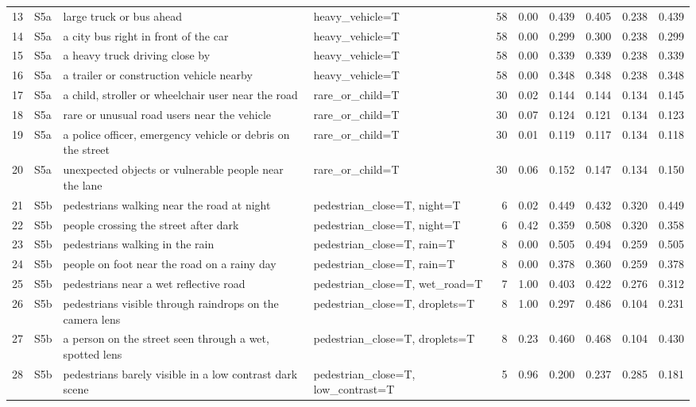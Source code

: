 \begin{longtable}{r l p{4.0cm} p{3.0cm} r r r r r r}
13 & S5a & large truck or bus ahead & heavy\_vehicle=T & 58 & 0.00 & 0.439 & 0.405 & 0.238 & 0.439\\
14 & S5a & a city bus right in front of the car & heavy\_vehicle=T & 58 & 0.00 & 0.299 & 0.300 & 0.238 & 0.299\\
15 & S5a & a heavy truck driving close by & heavy\_vehicle=T & 58 & 0.00 & 0.339 & 0.339 & 0.238 & 0.339\\
16 & S5a & a trailer or construction vehicle nearby & heavy\_vehicle=T & 58 & 0.00 & 0.348 & 0.348 & 0.238 & 0.348\\
17 & S5a & a child, stroller or wheelchair user near the road & rare\_or\_child=T & 30 & 0.02 & 0.144 & 0.144 & 0.134 & 0.145\\
18 & S5a & rare or unusual road users near the vehicle & rare\_or\_child=T & 30 & 0.07 & 0.124 & 0.121 & 0.134 & 0.123\\
19 & S5a & a police officer, emergency vehicle or debris on the street & rare\_or\_child=T & 30 & 0.01 & 0.119 & 0.117 & 0.134 & 0.118\\
20 & S5a & unexpected objects or vulnerable people near the lane & rare\_or\_child=T & 30 & 0.06 & 0.152 & 0.147 & 0.134 & 0.150\\
21 & S5b & pedestrians walking near the road at night & pedestrian\_close=T, night=T & 6 & 0.02 & 0.449 & 0.432 & 0.320 & 0.449\\
22 & S5b & people crossing the street after dark & pedestrian\_close=T, night=T & 6 & 0.42 & 0.359 & 0.508 & 0.320 & 0.358\\
23 & S5b & pedestrians walking in the rain & pedestrian\_close=T, rain=T & 8 & 0.00 & 0.505 & 0.494 & 0.259 & 0.505\\
24 & S5b & people on foot near the road on a rainy day & pedestrian\_close=T, rain=T & 8 & 0.00 & 0.378 & 0.360 & 0.259 & 0.378\\
25 & S5b & pedestrians near a wet reflective road & pedestrian\_close=T, wet\_road=T & 7 & 1.00 & 0.403 & 0.422 & 0.276 & 0.312\\
26 & S5b & pedestrians visible through raindrops on the camera lens & pedestrian\_close=T, droplets=T & 8 & 1.00 & 0.297 & 0.486 & 0.104 & 0.231\\
27 & S5b & a person on the street seen through a wet, spotted lens & pedestrian\_close=T, droplets=T & 8 & 0.23 & 0.460 & 0.468 & 0.104 & 0.430\\
28 & S5b & pedestrians barely visible in a low contrast dark scene & pedestrian\_close=T, low\_contrast=T & 5 & 0.96 & 0.200 & 0.237 & 0.285 & 0.181\\

\end{longtable}
